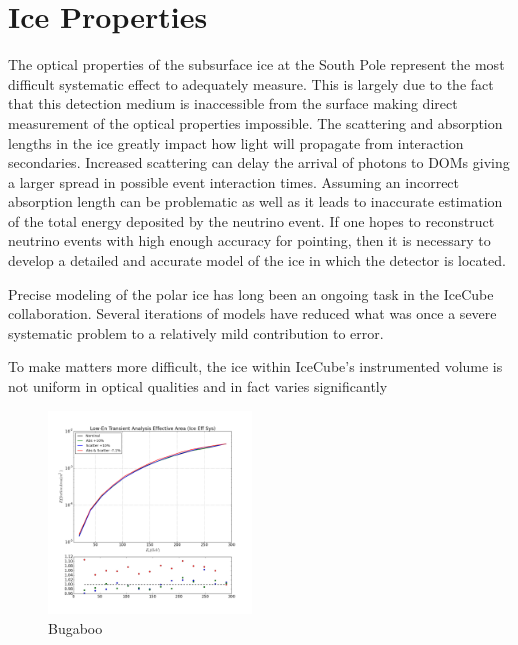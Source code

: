 \documentclass{gatech-thesis}
\begin{document}
\section{Ice Properties}
The optical properties of the subsurface ice at the South Pole represent the most difficult systematic effect to adequately measure. This is largely due to the fact that this detection medium is inaccessible from the surface making direct measurement of the optical properties impossible. The scattering and absorption lengths in the ice greatly impact how light will propagate from interaction secondaries. Increased scattering can delay the arrival of photons to DOMs giving a larger spread in possible event interaction times. Assuming an incorrect absorption length can be problematic as well as it leads to inaccurate estimation of the total energy deposited by the neutrino event. If one hopes to reconstruct neutrino events with high enough accuracy for pointing, then it is necessary to develop a detailed and accurate model of the ice in which the detector is located.


Precise modeling of the polar ice has long been an ongoing task in the IceCube collaboration. Several iterations of models have reduced what was once a severe systematic problem to a relatively mild contribution to error. 

To make matters more difficult, the ice within IceCube's instrumented volume is not uniform in optical qualities and in fact varies significantly 

\begin{figure}
  \begin{center}
    \includegraphics[width=0.48\textwidth,keepaspectratio]{LowEnTransient_EffArea_SysNugen_IceEffect_300GeVTrunc.png}
  \end{center}
  \caption{Bugaboo}
  \label{fig:IceSysEffArea}
\end{figure}
\end{document}
